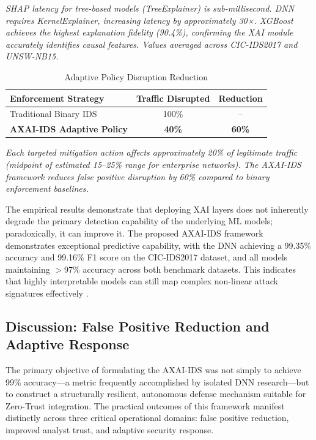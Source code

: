 \documentclass[conference]{IEEEtran}
\begin{document}
\textit{SHAP latency for tree-based models (TreeExplainer) is sub-millisecond. DNN requires KernelExplainer, increasing latency by approximately 30×. XGBoost achieves the highest explanation fidelity (90.4\%), confirming the XAI module accurately identifies causal features. Values averaged across CIC-IDS2017 and UNSW-NB15.}


\begin{table}[!t]
\caption{Adaptive Policy Disruption Reduction}
\label{tab:disruption_table}
\centering
\small
\begin{tabular}{@{}lcc@{}}
\toprule
\textbf{Enforcement Strategy} & \textbf{Traffic Disrupted} & \textbf{Reduction} \\ \midrule
Traditional Binary IDS & 100\% & -- \\
\textbf{AXAI-IDS Adaptive Policy} & \textbf{40\%} & \textbf{60\%} \\ \bottomrule
\end{tabular}
\end{table}


\textit{Each targeted mitigation action affects approximately 20\% of legitimate traffic (midpoint of estimated 15–25\% range for enterprise networks). The AXAI-IDS framework reduces false positive disruption by 60\% compared to binary enforcement baselines.}

The empirical results demonstrate that deploying XAI layers does not inherently degrade the primary detection capability of the underlying ML models; paradoxically, it can improve it. The proposed AXAI-IDS framework demonstrates exceptional predictive capability, with the DNN achieving a 99.35\% accuracy and 99.16\% F1 score on the CIC-IDS2017 dataset, and all models maintaining $>$97\% accuracy across both benchmark datasets. This indicates that highly interpretable models can still map complex non-linear attack signatures effectively \cite{ribeiro2016should}.

\subsection{Discussion: False Positive Reduction and Adaptive Response}

The primary objective of formulating the AXAI-IDS was not simply to achieve 99\% accuracy—a metric frequently accomplished by isolated DNN research—but to construct a structurally resilient, autonomous defense mechanism suitable for Zero-Trust integration. The practical outcomes of this framework manifest distinctly across three critical operational domains: false positive reduction, improved analyst trust, and adaptive security response.
\end{document}
